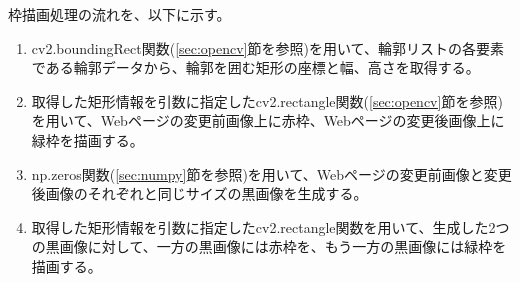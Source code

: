\par
枠描画処理の流れを、以下に示す。
\begin{enumerate}
    \item cv2.boundingRect関数(\ref{sec:opencv}節を参照)を用いて、輪郭リストの各要素である輪郭データから、輪郭を囲む矩形の座標と幅、高さを取得する。
    \item 取得した矩形情報を引数に指定したcv2.rectangle関数(\ref{sec:opencv}節を参照)を用いて、Webページの変更前画像上に赤枠、Webページの変更後画像上に緑枠を描画する。
    \item np.zeros関数(\ref{sec:numpy}節を参照)を用いて、Webページの変更前画像と変更後画像のそれぞれと同じサイズの黒画像を生成する。
    \item 取得した矩形情報を引数に指定したcv2.rectangle関数を用いて、生成した2つの黒画像に対して、一方の黒画像には赤枠を、もう一方の黒画像には緑枠を描画する。
\end{enumerate}



